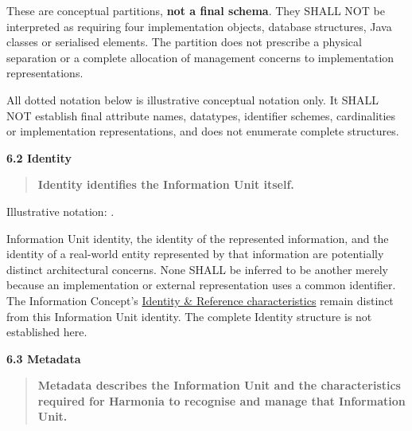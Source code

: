 These are conceptual partitions, \textbf{not a final schema}. They SHALL NOT be
interpreted as requiring four implementation objects, database structures,
Java classes or serialised elements. The partition does not prescribe a physical
separation or a complete allocation of management concerns to implementation
representations.



All dotted notation below is illustrative conceptual notation only. It SHALL
NOT establish final attribute names, datatypes, identifier schemes, cardinalities
or implementation representations, and does not enumerate complete structures.



\par\medskip\textbf{6.2 Identity}\par


\begin{quote}


\textbf{Identity identifies the Information Unit itself.}



\end{quote}


Illustrative notation: \texttt{}.



Information Unit identity, the identity of the represented information, and the
identity of a real-world entity represented by that information are potentially
distinct architectural concerns. None SHALL be inferred to be another merely
because an implementation or external representation uses a common identifier.
The Information Concept's \href{\detokenize{../../../../../docs/markdown/04-information-architecture/metamodel/information-architecture-metamodel.md#31-identity--reference}}{Identity \& Reference characteristics}
remain distinct from this Information Unit identity. The complete Identity
structure is not established here.



\par\medskip\textbf{6.3 Metadata}\par


\begin{quote}


\textbf{Metadata describes the Information Unit and the characteristics required for Harmonia to recognise and manage that Information Unit.}



\end{quote}


